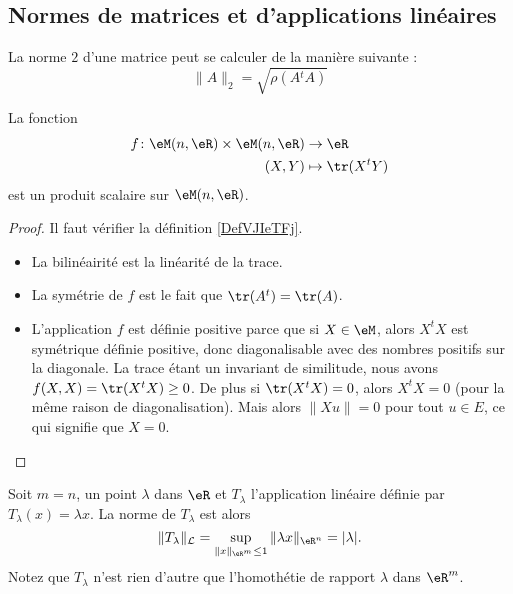 \subsection{Normes de matrices et d'applications linéaires}
\label{subsecNomrApplLin}


\begin{theorem}
    La norme $2$ d'une matrice peut se calculer de la manière suivante :
    \begin{equation}
        \|A\|_2=\sqrt{\rho(A{^t}A)}
    \end{equation}
\end{theorem}

\begin{proposition} \label{PropMAQoKAg}
    La fonction
    \begin{equation}
        \begin{aligned}
            f\colon \eM(n,\eR)\times \eM(n,\eR)&\to \eR \\
            (X,Y)&\mapsto \tr(X^tY) 
        \end{aligned}
    \end{equation}
    est un produit scalaire sur \( \eM(n,\eR)\).
\end{proposition}

\begin{proof}
    Il faut vérifier la définition \ref{DefVJIeTFj}.
    \begin{itemize}
        \item La bilinéairité est la linéarité de la trace.
        \item La symétrie de \( f\) est le fait que \( \tr(A^t)=\tr(A)\).
        \item L'application \( f\) est définie positive parce que si \( X\in \eM\), alors \( X^tX\) est symétrique définie positive, donc diagonalisable avec des nombres positifs sur la diagonale. La trace étant un invariant de similitude, nous avons \( f(X,X)=\tr(X^tX)\geq 0\). De plus si \( \tr(X^tX)=0\), alors \( X^tX=0\) (pour la même raison de diagonalisation). Mais alors \( \| Xu \|=0\) pour tout \( u\in E\), ce qui signifie que \( X=0\).
    \end{itemize}
\end{proof}

\begin{example}
	Soit $m=n$, un point $\lambda$ dans $\eR$ et $T_{\lambda}$ l'application linéaire définie par $T_{\lambda}(x)=\lambda x$. La norme de $T_{\lambda}$ est alors
\[
\|T_{\lambda}\|_{\mathcal{L}}=\sup_{\|x\|_{\eR^m}\leq 1}\|\lambda x\|_{\eR^n}= |\lambda|.
\]
Notez que $T_{\lambda}$ n'est rien d'autre que l'homothétie de rapport $\lambda$ dans $\eR^m$.
\end{example}

